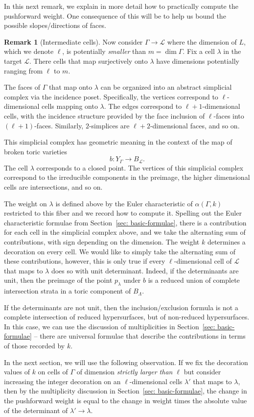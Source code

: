 \documentclass[11pt]{amsart}
\theoremstyle{definition}
\theoremstyle{definition}
\newtheorem{remark}[theorem]{Remark}
\begin{document}
In this next remark, we explain in more detail how to practically compute the pushforward weight. One consequence of this will be to help us bound the possible slopes/directions of faces. 

\begin{remark}[Intermediate cells]\label{rem: intermediate cells}
Now consider $\Gamma\to\mathcal L$ where the dimension of $L$, which we denote $\ell$, is potentially {\it smaller} than $m = \dim \Gamma$. Fix a cell $\lambda$ in the target $\mathcal L$. There cells that map surjectively onto $\lambda$ have dimensions potentially ranging from $\ell$ to $m$. 

The faces of $\Gamma$ that map onto $\lambda$ can be organized into an abstract simplicial complex via the incidence poset. Specifically, the vertices correspond to $\ell$-dimensional cells mapping onto $\lambda$. The edges correspond to $\ell+1$-dimensional cells, with the incidence structure provided by the face inclusion of $\ell$-faces into $(\ell+1)$-faces. Similarly, $2$-simplices are $\ell+2$-dimensional faces, and so on. 

This simplicial complex has geometric meaning in the context of the map of broken toric varieties
\[
b\colon Y_\Gamma\to B_{\mathcal L}.
\]
The cell $\lambda$ corresponds to a closed point. The vertices of this simplicial complex correspond to the irreducible components in the preimage, the higher dimensional cells are intersections, and so on.

The weight on $\lambda$ is defined above by the Euler characteristic of $\alpha(\Gamma,k)$ restricted to this fiber and we record how to compute it. Spelling out the Euler characteristic formulae from Section~\ref{sec: basic-formulae}, there is a contribution for each cell in the simplicial complex above, and we take the alternating sum of contributions, with sign depending on the dimension. The weight $k$ determines a decoration on every cell. We would like to simply take the alternating sum of these contributions, however, this is only true if every $\ell$-dimensional cell of $\mathcal L$ that maps to $\lambda$ does so with unit determinant. Indeed, if the determinants are unit, then the preimage of the point $p_\lambda$ under $b$ is a reduced union of complete intersection strata in a toric component of $B_\Lambda$. 

If the determinants are not unit, then the inclusion/exclusion formula is not a complete intersection of reduced hypersurfaces, but of non-reduced hypersurfaces. In this case, we can use the discussion of multiplicities in Section~\ref{sec: basic-formulae} -- there are universal formulae that describe the contributions in terms of those recorded by $k$. 

In the next section, we will use the following observation. If we fix the decoration values of $k$ on cells of $\Gamma$ of dimension {\it strictly larger than $\ell$} but consider increasing the integer decoration on an $\ell$-dimensional cells $\lambda'$ that maps to $\lambda$, then by the multiplicity discussion in Section~\ref{sec: basic-formulae}, the change in the pushforward weight is equal to the change in weight times the absolute value of the determinant of $\lambda'\to\lambda$. 
\end{remark}
\end{document}
